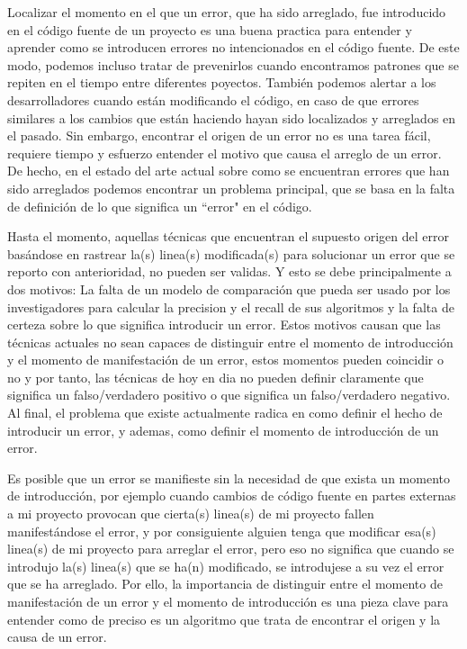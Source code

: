 \documentclass[a4paper, 12pt]{book}
\begin{document}
Localizar el momento en el que un error, que ha sido arreglado, fue introducido en el c\'odigo fuente de un proyecto es una buena practica para entender y aprender como se introducen errores no intencionados en el c\'odigo fuente. De este modo, podemos incluso tratar de prevenirlos cuando encontramos patrones que se repiten en el tiempo entre diferentes poyectos. Tambi\'en podemos alertar a los desarrolladores cuando est\'an modificando el c\'odigo, en caso de que errores similares a los cambios que est\'an haciendo hayan sido localizados y arreglados en el pasado. Sin embargo, encontrar el origen de un error no es una tarea f\'acil, requiere tiempo y esfuerzo entender el motivo que causa el arreglo de un error. De hecho, en el estado del arte actual sobre como se encuentran errores que han sido arreglados podemos encontrar un problema principal, que se basa en la falta de definici\'on de lo que significa un ``error" en el c\'odigo.

Hasta el momento, aquellas t\'ecnicas que encuentran el supuesto origen del error bas\'andose en rastrear la(s) linea(s) modificada(s) para solucionar un error que se reporto con anterioridad, no pueden ser validas. Y esto se debe principalmente a dos motivos: La falta de un modelo de comparaci\'on que pueda ser usado por los investigadores para calcular la precision y el recall de sus algoritmos y la falta de certeza sobre lo que significa introducir un error. Estos motivos causan que las t\'ecnicas actuales no sean capaces de distinguir entre el momento de introducci\'on y el momento de manifestaci\'on de un error, estos momentos pueden coincidir o no y por tanto, las t\'ecnicas de hoy en dia no pueden definir claramente que significa un falso/verdadero positivo o que significa un falso/verdadero negativo. Al final, el problema que existe actualmente radica en como definir el hecho de introducir un error, y ademas, como definir el momento de introducci\'on de un error.

Es posible que un error se manifieste sin la necesidad de que exista un momento de introducci\'on, por ejemplo cuando cambios de c\'odigo fuente en partes externas a mi proyecto provocan que cierta(s) linea(s) de mi proyecto fallen manifest\'andose el error, y por consiguiente alguien tenga que modificar esa(s) linea(s) de mi proyecto para arreglar el error, pero eso no significa que cuando se introdujo la(s) linea(s) que se ha(n) modificado, se introdujese a su vez el error que se ha arreglado. Por ello, la importancia de distinguir entre el momento de manifestaci\'on de un error y el momento de introducci\'on es una pieza clave para entender como de preciso es un algoritmo que trata de encontrar el origen y la causa de un error.
\end{document}
